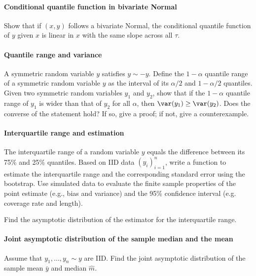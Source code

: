 \paragraph{Conditional quantile function in bivariate Normal}\label{hw22::qr-bivariate-Normal}

Show that if $(x,y)$ follows a bivariate Normal, the conditional quantile function of $y$ given $x$ is linear in $x$ with the same slope across all $\tau$. 

\paragraph{Quantile range and variance}\label{hw22::quantile-range-variance}

A symmetric random variable $y$ satisfies $y \sim -y$. 
Define the $1-\alpha$ quantile range of a symmetric random variable $y$ as the interval of its $\alpha/2$  and $1-\alpha/2$ quantiles. 
Given two symmetric random variables $y_1$ and $y_2$, show that if the $1-\alpha$ quantile range of $y_1$ is wider than that of $y_2$ for all $\alpha$, then $\var(y_1) \geq \var(y_2)$. Does the converse of the statement hold? If so, give a proof; if not, give a counterexample. 




\paragraph{Interquartile range and estimation}\label{hw22::interquartile-range}

The interquartile range of a random variable $y$ equals the difference between its 75\% and 25\% quantiles. 
Based on IID data $(y_i)_{i=1}^n$, write a function to estimate the interquartile range and the corresponding standard error using the bootstrap. Use simulated data to evaluate the finite sample properties of the point estimate (e.g., bias and variance) and the 95\% confidence interval (e.g. coverage rate and length). 


Find the asymptotic distribution of the estimator for the interquartile range. 

 

\paragraph{Joint asymptotic distribution of the sample median and the mean}
\label{hw22::joint-mean-median}

Assume that $y_1,\ldots, y_n \sim y$ are IID. Find the joint asymptotic distribution of the sample mean $\bar{y}$ and median $\hat{m}$.

